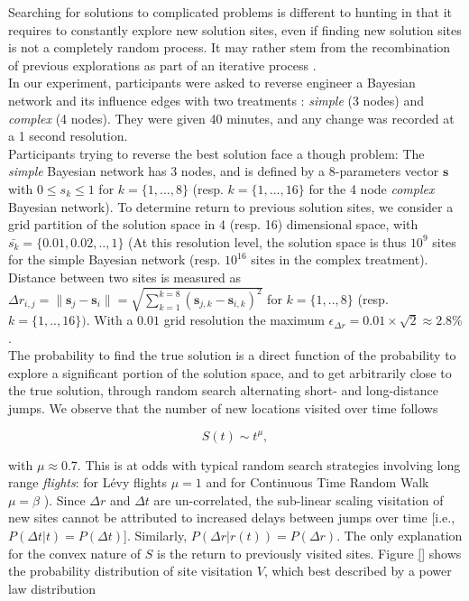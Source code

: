 Searching for solutions to complicated problems is different to hunting in that it requires to constantly explore new solution sites, even if finding new solution sites is not a completely random process. It may rather stem from the recombination of previous explorations as part of an iterative process \cite{}. \\

In our experiment, participants were asked to reverse engineer a Bayesian network and its influence edges with two treatments : {\it simple} (3 nodes) and {\it complex} (4 nodes). They were given 40 minutes, and any change was recorded at a 1 second resolution.\\

Participants trying to reverse the best solution face a though problem: The {\it simple} Bayesian network has 3 nodes, and is defined by a 8-parameters vector $\mathbf{s}$ with $0 \leqslant s_k  \leqslant 1$ for $k = \{1,...,8\}$ (resp. $k = \{1,..., 16\}$ for the 4 node {\it complex} Bayesian network). To determine return to previous solution sites, we consider a grid partition of the solution space in 4 (resp. 16) dimensional space, with $\bar{s_k} = \{0.01,0.02, .., 1\}$ (At this resolution level, the solution space is thus $10^{9}$ sites for the simple Bayesian network (resp. $10^{16}$ sites in the complex treatment). Distance between two sites is measured as $\Delta r_{i,j} = \| \mathbf{s}_j - \mathbf{s}_i \| = \sqrt{\sum_{k=1}^{k=8} (\mathbf{s}_{j,k} - \mathbf{s}_{i,k})^{2}}$ for $k = \{1,..,8\}$ (resp. $k = \{1,..,16\})$. With a $0.01$ grid resolution the maximum $\epsilon_{\Delta r} = 0.01 \times \sqrt{2} \approx 2.8\%$.\\

The probability to find the true solution is a direct function of the probability to explore a significant portion of the solution space, and to get arbitrarily close to the true solution, through random search alternating short- and long-distance jumps. We observe that the number of new locations visited over time follows

\begin{equation}
S(t)  \sim t^{\mu},
\end{equation}

with $\mu \approx 0.7$. This is at odds with typical random search strategies involving long range {\it flights}: for L\'evy flights $\mu = 1$ \cite{} and for Continuous Time Random Walk $\mu = \beta$ \cite{}). Since $\Delta r$ and $\Delta t$ are un-correlated, the sub-linear scaling visitation of new sites cannot be attributed to increased delays between jumps over time [i.e., $P(\Delta t|t) = P(\Delta t)$]. Similarly, $P(\Delta r|r(t)) = P(\Delta r)$. The only explanation for the convex nature of $S$ is the return to previously visited sites. Figure \ref{} shows the probability distribution of site visitation  $V$, which best described by a power law distribution

